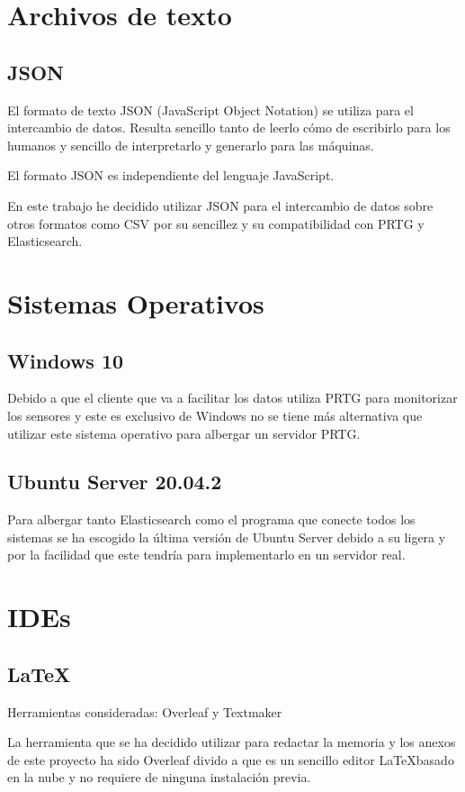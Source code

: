 \section{Archivos de texto}
\subsection{JSON}
El formato de texto JSON (JavaScript Object Notation) se utiliza para el intercambio de datos. Resulta sencillo tanto de leerlo cómo de escribirlo para los humanos y sencillo de interpretarlo y generarlo para las máquinas.

El formato JSON es independiente del lenguaje JavaScript.

En este trabajo he decidido utilizar JSON para el intercambio de datos sobre otros formatos como CSV por su sencillez y su compatibilidad con PRTG y Elasticsearch.\cite{pagina:JSON}


\section{Sistemas Operativos}

\subsection{Windows 10}
Debido a que el cliente que va a facilitar los datos utiliza PRTG para monitorizar los sensores y este es exclusivo de Windows no se tiene más alternativa que utilizar este sistema operativo para albergar un servidor PRTG.

\subsection{Ubuntu Server 20.04.2}
Para albergar tanto Elasticsearch como el programa que conecte todos los sistemas se ha escogido la última versión de Ubuntu Server debido a su ligera y por la facilidad que este tendría para implementarlo en un servidor real.

\section{IDEs}

\subsection{\LaTeX}
Herramientas consideradas: Overleaf y Textmaker

La herramienta que se ha decidido utilizar para redactar la memoria y los anexos de este proyecto ha sido Overleaf divido a que es un sencillo editor \LaTeX basado en la nube y no requiere de ninguna instalación previa.


